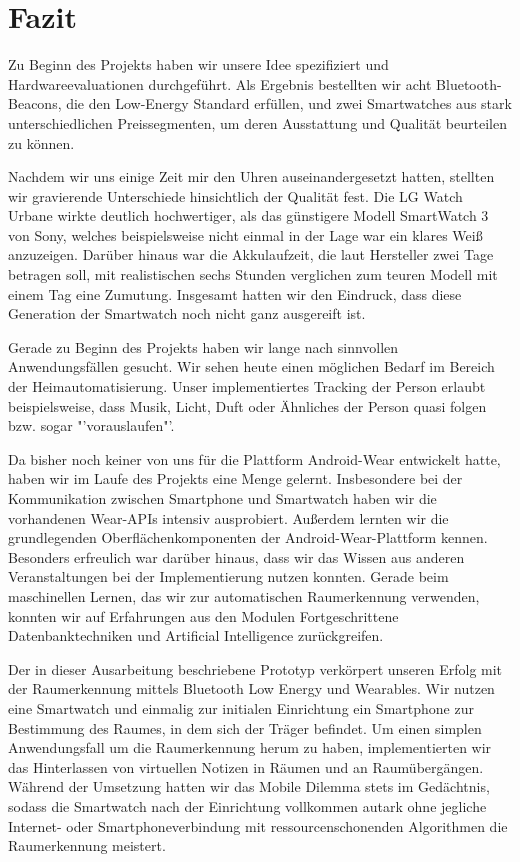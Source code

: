 \section{Fazit}
Zu Beginn des Projekts haben wir unsere Idee spezifiziert und Hardwareevaluationen durchgeführt. Als Ergebnis bestellten wir acht Bluetooth-Beacons, die den Low-Energy Standard erfüllen, und zwei Smartwatches aus stark unterschiedlichen Preissegmenten, um deren Ausstattung und Qualität beurteilen zu können.

Nachdem wir uns einige Zeit mir den Uhren auseinandergesetzt hatten, stellten wir gravierende Unterschiede hinsichtlich der Qualität fest. Die LG Watch Urbane wirkte deutlich hochwertiger, als das günstigere Modell SmartWatch 3 von Sony, welches beispielsweise nicht einmal in der Lage war ein klares Weiß anzuzeigen. Darüber hinaus war die Akkulaufzeit, die laut Hersteller zwei Tage betragen soll, mit realistischen sechs Stunden verglichen zum teuren Modell mit einem Tag eine Zumutung. Insgesamt hatten wir den Eindruck, dass diese Generation der Smartwatch noch nicht ganz ausgereift ist. 

Gerade zu Beginn des Projekts haben wir lange nach sinnvollen Anwendungsfällen gesucht. Wir sehen heute einen möglichen Bedarf im Bereich der Heimautomatisierung. Unser implementiertes Tracking der Person erlaubt beispielsweise, dass Musik, Licht, Duft oder Ähnliches der Person quasi folgen bzw. sogar "'vorauslaufen"'.

Da bisher noch keiner von uns für die Plattform Android-Wear entwickelt hatte, haben wir im Laufe des Projekts eine Menge gelernt. Insbesondere bei der Kommunikation zwischen Smartphone und Smartwatch haben wir die vorhandenen Wear-APIs intensiv ausprobiert. Außerdem lernten wir die grundlegenden Oberflächenkomponenten der Android-Wear-Plattform kennen. Besonders erfreulich war darüber hinaus, dass wir das Wissen aus anderen Veranstaltungen bei der Implementierung nutzen konnten. Gerade beim maschinellen Lernen, das wir zur automatischen Raumerkennung verwenden, konnten wir auf Erfahrungen aus den Modulen Fortgeschrittene Datenbanktechniken und Artificial Intelligence zurückgreifen.

Der in dieser Ausarbeitung beschriebene Prototyp verkörpert unseren Erfolg mit der Raumerkennung mittels Bluetooth Low Energy und Wearables. Wir nutzen eine Smartwatch und einmalig zur initialen Einrichtung ein Smartphone zur Bestimmung des Raumes, in dem sich der Träger befindet. Um einen simplen Anwendungsfall um die Raumerkennung herum zu haben, implementierten wir das Hinterlassen von virtuellen Notizen in Räumen und an Raumübergängen. Während der Umsetzung hatten wir das Mobile Dilemma stets im Gedächtnis, sodass die Smartwatch nach der Einrichtung vollkommen autark ohne jegliche Internet- oder Smartphoneverbindung mit ressourcenschonenden Algorithmen die Raumerkennung meistert.

